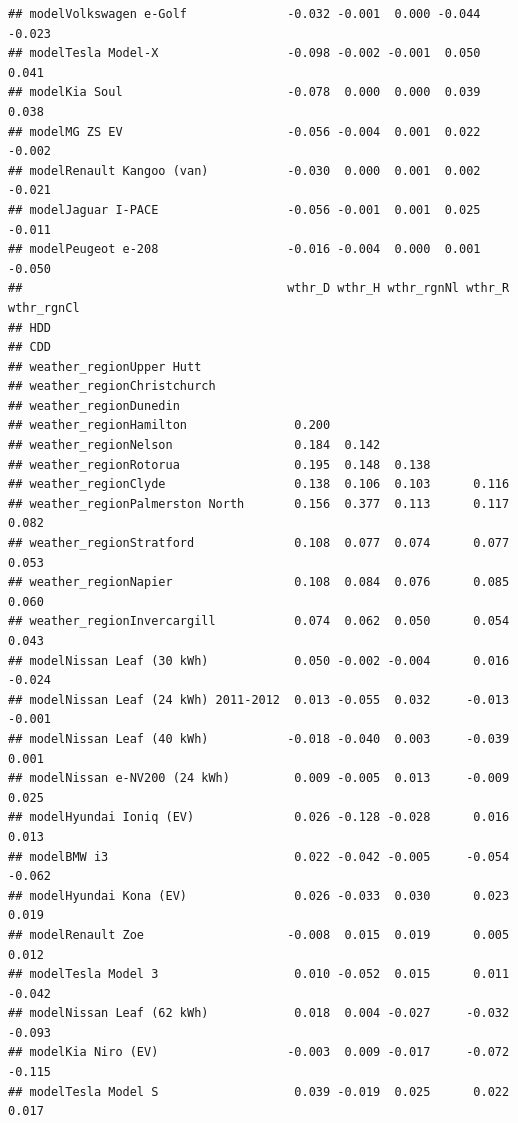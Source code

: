 \documentclass[
]{article}
\begin{document}
\begin{verbatim}
## modelVolkswagen e-Golf              -0.032 -0.001  0.000 -0.044 -0.023    
## modelTesla Model-X                  -0.098 -0.002 -0.001  0.050  0.041    
## modelKia Soul                       -0.078  0.000  0.000  0.039  0.038    
## modelMG ZS EV                       -0.056 -0.004  0.001  0.022 -0.002    
## modelRenault Kangoo (van)           -0.030  0.000  0.001  0.002 -0.021    
## modelJaguar I-PACE                  -0.056 -0.001  0.001  0.025 -0.011    
## modelPeugeot e-208                  -0.016 -0.004  0.000  0.001 -0.050    
##                                     wthr_D wthr_H wthr_rgnNl wthr_R wthr_rgnCl
## HDD                                                                           
## CDD                                                                           
## weather_regionUpper Hutt                                                      
## weather_regionChristchurch                                                    
## weather_regionDunedin                                                         
## weather_regionHamilton               0.200                                    
## weather_regionNelson                 0.184  0.142                             
## weather_regionRotorua                0.195  0.148  0.138                      
## weather_regionClyde                  0.138  0.106  0.103      0.116           
## weather_regionPalmerston North       0.156  0.377  0.113      0.117  0.082    
## weather_regionStratford              0.108  0.077  0.074      0.077  0.053    
## weather_regionNapier                 0.108  0.084  0.076      0.085  0.060    
## weather_regionInvercargill           0.074  0.062  0.050      0.054  0.043    
## modelNissan Leaf (30 kWh)            0.050 -0.002 -0.004      0.016 -0.024    
## modelNissan Leaf (24 kWh) 2011-2012  0.013 -0.055  0.032     -0.013 -0.001    
## modelNissan Leaf (40 kWh)           -0.018 -0.040  0.003     -0.039  0.001    
## modelNissan e-NV200 (24 kWh)         0.009 -0.005  0.013     -0.009  0.025    
## modelHyundai Ioniq (EV)              0.026 -0.128 -0.028      0.016  0.013    
## modelBMW i3                          0.022 -0.042 -0.005     -0.054 -0.062    
## modelHyundai Kona (EV)               0.026 -0.033  0.030      0.023  0.019    
## modelRenault Zoe                    -0.008  0.015  0.019      0.005  0.012    
## modelTesla Model 3                   0.010 -0.052  0.015      0.011 -0.042    
## modelNissan Leaf (62 kWh)            0.018  0.004 -0.027     -0.032 -0.093    
## modelKia Niro (EV)                  -0.003  0.009 -0.017     -0.072 -0.115    
## modelTesla Model S                   0.039 -0.019  0.025      0.022  0.017    

\end{verbatim}
\end{document}
